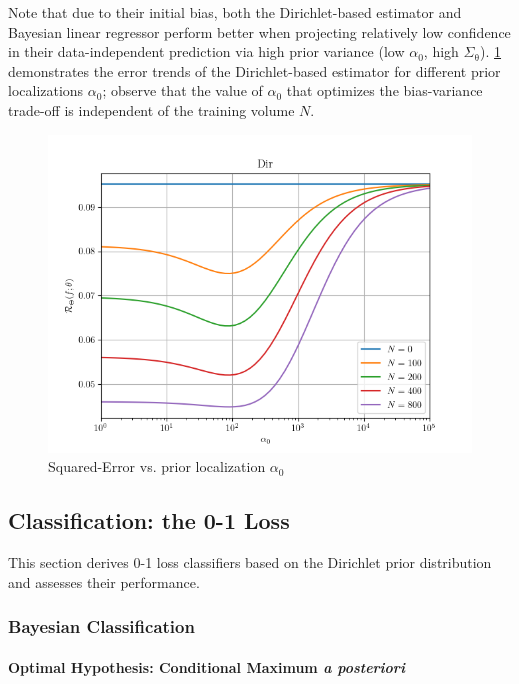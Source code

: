 \documentclass[12pt]{report}
\begin{document}
Note that due to their initial bias, both the Dirichlet-based estimator and Bayesian linear regressor perform better when projecting relatively low confidence in their data-independent prediction via high prior variance (low $\alpha_0$, high $\Sigma_{\uptheta}$). \cref{fig:Discrete/SE/risk_a0_leg_N} demonstrates the error trends of the Dirichlet-based estimator for different prior localizations $\alpha_0$; observe that the value of $\alpha_0$ that optimizes the bias-variance trade-off is independent of the training volume $N$. 
\begin{figure}
	\centering
	\includegraphics[width=0.8\linewidth]{Discrete/SE/risk_a0_leg_N.png}
	\caption{Squared-Error vs. prior localization $\alpha_0$}
	\label{fig:Discrete/SE/risk_a0_leg_N}
\end{figure} 












\subsection{Classification: the 0-1 Loss}

This section derives 0-1 loss classifiers based on the Dirichlet prior distribution and assesses their performance.

\subsubsection{Bayesian Classification}

\paragraph{Optimal Hypothesis: Conditional Maximum \emph{a posteriori}}
\end{document}
